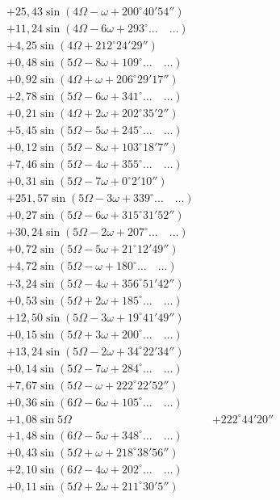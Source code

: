 \documentclass[10pt,a4paper]{article}
\begin{document}
\begin{align*}
&+ 25,43 \sin(4\Omega - \omega + 200^{\circ}40'54'') \\
&+ 11,24 \sin(4\Omega - 6\omega + 293^{\circ}\ldots \quad \ldots) \\
&+ 4,25 \sin(4\Omega + 212^{\circ}24'29'') \\
&+ 0,48 \sin(5\Omega - 8\omega + 109^{\circ}\ldots \quad \ldots) \\
&+ 0,92 \sin(4\Omega + \omega + 206^{\circ}29'17'') \\
&+ 2,78 \sin(5\Omega - 6\omega + 341^{\circ}\ldots \quad \ldots) \\
&+ 0,21 \sin(4\Omega + 2\omega + 202^{\circ}35'2'') \\
&+ 5,45 \sin(5\Omega - 5\omega + 245^{\circ}\ldots \quad \ldots) \\
&+ 0,12 \sin(5\Omega - 8\omega + 103^{\circ}18'7'') \\
&+ 7,46 \sin(5\Omega - 4\omega + 355^{\circ}\ldots \quad \ldots) \\
&+ 0,31 \sin(5\Omega - 7\omega + 0^{\circ}2'10'') \\
&+ 251,57 \sin(5\Omega - 3\omega + 339^{\circ}\ldots \quad \ldots) \\
&+ 0,27 \sin(5\Omega - 6\omega + 315^{\circ}31'52'') \\
&+ 30,24 \sin(5\Omega - 2\omega + 207^{\circ}\ldots \quad \ldots) \\
&+ 0,72 \sin(5\Omega - 5\omega + 21^{\circ}12'49'') \\
&+ 4,72 \sin(5\Omega - \omega + 180^{\circ}\ldots \quad \ldots) \\
&+ 3,24 \sin(5\Omega - 4\omega + 356^{\circ}51'42'') \\
&+ 0,53 \sin(5\Omega + 2\omega + 185^{\circ}\ldots \quad \ldots) \\
&+ 12,50 \sin(5\Omega - 3\omega + 19^{\circ}41'49'') \\
&+ 0,15 \sin(5\Omega + 3\omega + 200^{\circ}\ldots \quad \ldots) \\
&+ 13,24 \sin(5\Omega - 2\omega + 34^{\circ}22'34'') \\
&+ 0,14 \sin(5\Omega - 7\omega + 284^{\circ}\ldots \quad \ldots) \\
&+ 7,67 \sin(5\Omega - \omega + 222^{\circ}22'52'') \\
&+ 0,36 \sin(6\Omega - 6\omega + 105^{\circ}\ldots \quad \ldots) \\
&+ 1,08 \sin 5\Omega &&+ 222^{\circ}44'20'' \\
&+ 1,48 \sin(6\Omega - 5\omega + 348^{\circ}\ldots \quad \ldots) \\
&+ 0,43 \sin(5\Omega + \omega + 218^{\circ}38'56'') \\
&+ 2,10 \sin(6\Omega - 4\omega + 202^{\circ}\ldots \quad \ldots) \\
&+ 0,11 \sin(5\Omega + 2\omega + 211^{\circ}30'5'')
\end{align*}
\end{document}
